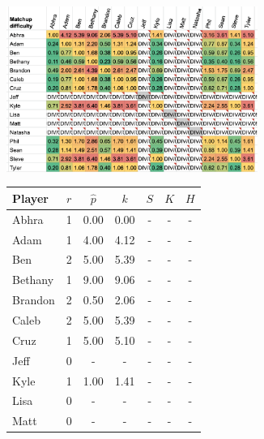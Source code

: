 \documentclass[letterpaper, 10 pt, conference]{ieeeconf}  %
\begin{document}
\begin{figure}[hb]
        \centering
        \begin{subfigure}[h]{0.5\textwidth}
                \centering
                \includegraphics[width=0.9\textwidth]{fig/difficulty_3.png}
        \end{subfigure}
        \begin{subfigure}[h]{0.4\textwidth}
                \footnotesize
                \centering
                \begin{tabular}{lccc|ccc}
                        \toprule
                        Player  & $r$   & $\hat{p}$ & $k$ & $S$ & $K$ & $H$ \\
                        \midrule
                        Abhra	& 1	& 0.00	& 0.00 & - & - & - \\
                        Adam	& 1	& 4.00	& 4.12 & - & - & - \\
                        Ben	& 2	& 5.00	& 5.39 & - & - & - \\
                        Bethany	& 1	& 9.00	& 9.06 & - & - & - \\
                        Brandon	& 2	& 0.50	& 2.06 & - & - & - \\
                        Caleb	& 2	& 5.00	& 5.39 & - & - & - \\
                        Cruz	& 1	& 5.00	& 5.10 & - & - & - \\
                        Jeff	& 0	& -  	& -    & - & - & - \\
                        Kyle	& 1	& 1.00	& 1.41 & - & - & - \\
                        Lisa	& 0	& -  	& -    & - & - & - \\
                        Matt	& 0	& -  	& -    & - & - & - \\

\end{tabular}
\end{subfigure}
\end{figure}
\end{document}
